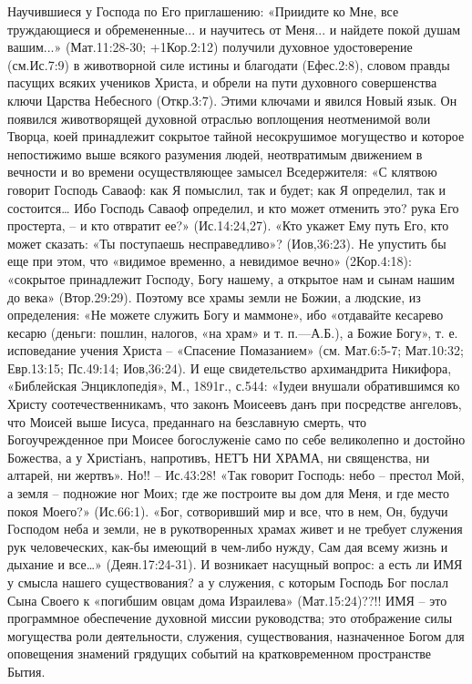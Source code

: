           Научившиеся у Господа по Его приглашению: «Приидите ко Мне, все труждающиеся и обремененные... и научитесь от Меня... и найдете покой душам вашим...» (Мат.11:28-30; +1Кор.2:12) получили духовное удостоверение (см.Ис.7:9) в животворной силе истины и благодати (Ефес.2:8), словом правды пасущих всяких учеников Христа, и обрели на пути духовного совершенства ключи Царства Небесного (Откр.3:7).
          Этими ключами и явился Новый язык. Он появился животворящей духовной отраслью воплощения неотменимой воли Творца, коей принадлежит сокрытое тайной несокрушимое могущество и которое непостижимо выше всякого разумения людей, неотвратимым движением в вечности и во времени осуществляющее замысел Вседержителя: «С клятвою говорит Господь Саваоф: как Я помыслил, так и будет; как Я определил, так и состоится… Ибо Господь Саваоф определил, и кто может отменить это?  рука Его простерта, – и кто отвратит ее?» (Ис.14:24,27). «Кто укажет Ему путь Его, кто может сказать: «Ты поступаешь несправедливо»? (Иов,36:23).  Не упустить бы еще при этом, что «видимое временно, а невидимое вечно» (2Кор.4:18):  «сокрытое принадлежит Господу, Богу нашему, а открытое нам и сынам нашим до века» (Втор.29:29). Поэтому все храмы земли не Божии, а людские, из определения: «Не можете служить Богу и маммоне», ибо «отдавайте кесарево кесарю (деньги: пошлин, налогов, «на храм» и т. п.—А.Б.), а Божие Богу», т. е. исповедание учения Христа – «Спасение Помазанием» (см. Мат.6:5-7; Мат.10:32; Евр.13:15; Пс.49:14; Иов,36:24). И еще свидетельство архимандрита Никифора, «Библейская Энциклопедія», М., 1891г., с.544:
                «Іудеи внушали обратившимся ко Христу соотечественникамъ, что законъ Моисеевъ данъ при посредстве ангеловъ, что Моисей выше Іисуса, преданнаго на безславную смерть, что Богоучрежденное при Моисее богослуженіе само по себе великолепно и достойно Божества, а у Христіанъ, напротивъ, НЕТЪ  НИ  ХРАМА, ни священства, ни алтарей, ни жертвъ». Но!! – Ис.43:28!
    «Так говорит Господь: небо – престол Мой, а земля – подножие ног Моих; где же построите вы дом для Меня, и где место покоя Моего?» (Ис.66:1).  «Бог, сотворивший мир и все, что в нем, Он, будучи Господом неба и земли, не в рукотворенных храмах живет и не требует служения рук человеческих, как-бы имеющий в чем-либо нужду, Сам дая всему жизнь и дыхание и все…» (Деян.17:24-31).
    И возникает насущный вопрос: а есть ли ИМЯ у смысла нашего существования? а у служения, с которым Господь Бог послал Сына Своего к «погибшим овцам дома Израилева» (Мат.15:24)??!!
        ИМЯ – это программное обеспечение духовной миссии руководства;   это отображение силы могущества роли деятельности, служения, существования, назначенное Богом для оповещения знамений грядущих событий на кратковременном пространстве Бытия.



